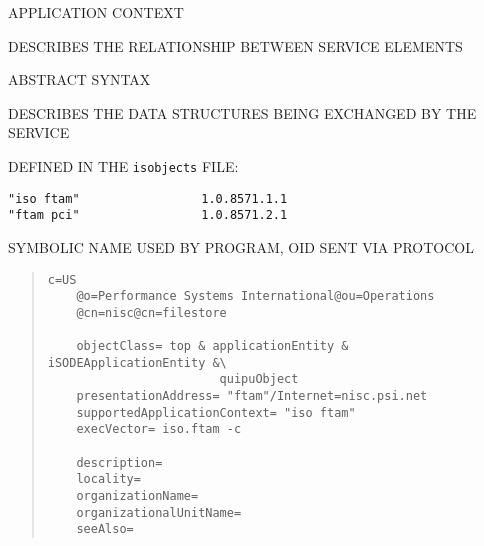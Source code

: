 

\begin{bwslide}

\begin{nrtc}
\item	APPLICATION CONTEXT
    \begin{nrtc}
    \item	DESCRIBES THE RELATIONSHIP BETWEEN SERVICE ELEMENTS
    \end{nrtc}

\item	ABSTRACT SYNTAX
    \begin{nrtc}
    \item	DESCRIBES THE DATA STRUCTURES BEING EXCHANGED BY THE SERVICE
    \end{nrtc}

\item	DEFINED IN THE \verb"isobjects" FILE:
\begin{verbatim}
"iso ftam"                 1.0.8571.1.1
"ftam pci"                 1.0.8571.2.1
\end{verbatim}

\item	SYMBOLIC NAME USED BY PROGRAM, OID SENT VIA PROTOCOL
\end{nrtc}
\end{bwslide}


\begin{bwslide}

\begin{quote}\small\begin{verbatim}
c=US
    @o=Performance Systems International@ou=Operations
    @cn=nisc@cn=filestore

    objectClass= top & applicationEntity & iSODEApplicationEntity &\
                        quipuObject
    presentationAddress= "ftam"/Internet=nisc.psi.net
    supportedApplicationContext= "iso ftam"
    execVector= iso.ftam -c

    description=
    locality=
    organizationName=
    organizationalUnitName=
    seeAlso=
\end{verbatim}\end{quote}
\end{bwslide}


